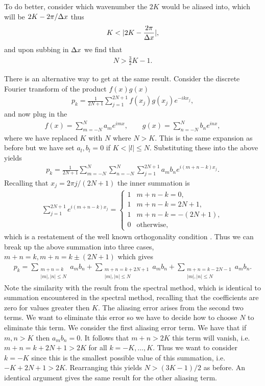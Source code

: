 To do better, consider which wavenumber the $2K$ would be aliased into, which will be $2K-2\pi/\Delta x$ thus
\begin{align}
K<|2K- \frac{2\pi}{\dx}|,
\end{align}
and upon subbing in $\Delta x$ we find that 
\begin{align}
N > \frac{3}{2}K - 1.
\end{align}

There is an alternative way to get at the same result. Consider the discrete Fourier transform of the product $f(x)g(x)$
\begin{align}
p_{k} = \frac{1}{2N+1}\sum_{j=1}^{2N+1}f(x_{j})g(x_{j})e^{-ikx_{j}},
\end{align}
and now plug in the 
\begin{align}
f(x) = \sum_{m=-N}^{N}a_{m}e^{imx}, \qquad g(x) = \sum_{n=-N}^{N}b_{n}e^{inx},
\end{align}
where we have replaced $K$ with $N$ where $N>K$. This is the same expansion as before but we have set $a_{l},b_{l}=0$ if $K < |l|\le N$. Substituting these into the above yields
\begin{align}
p_{k} = \frac{1}{2N+1}\sum_{m=-N}^{N}\sum_{n=-N}^{N}\sum_{j=1}^{2N+1}a_{m}b_{n}e^{i(m+n-k)x_{j}}.
\end{align}
Recalling that $x_{j} = 2\pi j/(2N+1)$ the inner summation is
\begin{align}
\sum_{j=1}^{2N+1}e^{i(m+n-k)x_{j}} =  \begin{cases}
1 & m+n-k =0,\\
1 & m+n-k =2N+1,\\
1 & m+n-k =-(2N+1),\\
0 & \text{otherwise,}
\end{cases}
\end{align}
which is a restatement of the well known orthogonality condition \cite{durran}. Thus we can break up the above summation into three cases, $m+n=k, m+n=k\pm(2N+1)$ which gives
\begin{align}
p_{k} = \sum_{\substack{m+n=k\\ |m|,|n|\le N}}a_{m}b_{n}+  \sum_{\substack{m+n=k+2N+1\\ |m|,|n|\le N}}a_{m}b_{n}+ \sum_{\substack{m+n=k-2N-1\\ |m|,|n|\le N}}a_{m}b_{n}.
\end{align}
Note the similarity with the result from the spectral method, which is identical to summation encountered in the spectral method, recalling that the coefficients are zero for values greater then $K$. The aliasing error arises from the second two terms. We want to eliminate this error so we have to decide how to choose $N$ to eliminate this term. We consider the first aliasing error term. We have that if $m,n>K$ then $a_{m}b_{n}=0$. It follows that $m+n>2K$ this term will vanish, i.e. $m+n=k+2N+1>2K$ for all $k=-K,\ldots,K$. Thus we want to consider $k=-K$ since this is the smallest possible value of this summation, i.e. $-K+2N+1>2K$. Rearranging this yields $N>(3K-1)/2$ as before. An identical argument gives the same result for the other aliasing term. 

